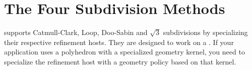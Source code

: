 






\section{The Four Subdivision Methods}
 supports Catmull-Clark, Loop, 
Doo-Sabin and $\sqrt{3}$ subdivisions by specializing
their respective refinement hosts. 
They are designed to work on a . If your application 
uses a polyhedron with a specialized geometry kernel, you need to 
specialize the refinement host with a geometry policy 
based on that kernel.


